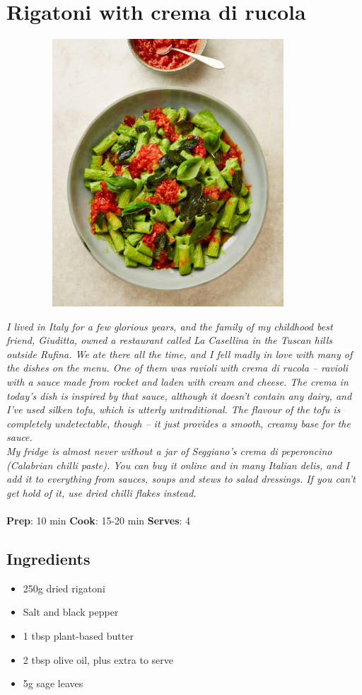 \documentclass{book}
\begin{document}
\section{Rigatoni with crema di rucola}
\begin{figure}
\centering\includegraphics[width=10cm,height=10cm,keepaspectratio]{Recipe_Pictures/Rigatoni_with_crema_di_rucola.png}
\end{figure}
\emph{I lived in Italy for a few glorious years, and the family of my childhood best friend, Giuditta, owned a restaurant called La Casellina in the Tuscan hills outside Rufina. We ate there all the time, and I fell madly in love with many of the dishes on the menu. One of them was ravioli with crema di rucola – ravioli with a sauce made from rocket and laden with cream and cheese. The crema in today’s dish is inspired by that sauce, although it doesn’t contain any dairy, and I’ve used silken tofu, which is utterly untraditional. The flavour of the tofu is completely undetectable, though – it just provides a smooth, creamy base for the sauce.\\ 
My fridge is almost never without a jar of Seggiano’s crema di peperoncino (Calabrian chilli paste). You can buy it online and in many Italian delis, and I add it to everything from sauces, soups and stews to salad dressings. If you can’t get hold of it, use dried chilli flakes instead.}\\\\ 
\textbf{Prep}: 10 min
\textbf{Cook}: 15-20 min
\textbf{Serves}: 4
\subsection*{Ingredients}
\begin{itemize}
\item 250g dried rigatoni
\item Salt and black pepper
\item 1 tbsp plant-based butter
\item 2 tbsp olive oil, plus extra to serve
\item 5g sage leaves
\end{itemize}
\end{document}
